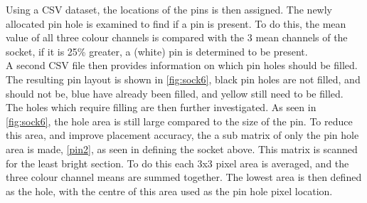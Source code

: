 \documentclass[11pt,a4paper, margin=1in]{report}
\begin{document}
Using a CSV dataset, the locations of the pins is then assigned. 
The newly allocated pin hole is examined to find if a pin is present. To do this, the mean value of all three colour channels is compared with the 3 mean channels of the socket, if it is 25\% greater, a (white) pin is determined to be present.\\
A second CSV file then provides information on which pin holes should be filled. The resulting pin layout is shown in \cref{fig:sock6}, black pin holes are not filled, and should not be, blue have already been filled, and yellow still need to be filled.\\
The holes which require filling are then further investigated. As seen in \cref{fig:sock6}, the hole area is still large compared to the size of the pin. To reduce this area, and improve placement accuracy, the a sub matrix of only the pin hole area is made, \cref{pin2}, as seen in defining the socket above. This matrix is scanned for the least bright section. To do this each 3x3 pixel area is averaged, and the three colour channel means are summed together. The lowest area is then defined as the hole, with the centre of this area used as the pin hole pixel location.  
 
\end{document}

